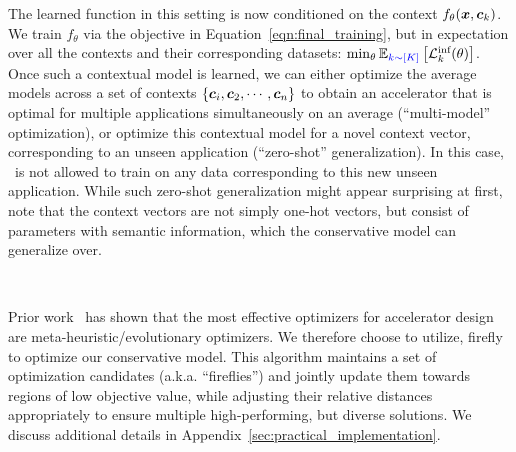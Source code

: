 The learned function in this setting is now conditioned on the context $f_\theta({\boldsymbol{x}}, {\boldsymbol{c}}_k)$. We train $f_\theta$ via the objective in Equation~\ref{eqn:final_training}, but in expectation over all the contexts and their corresponding datasets: $\min_\theta \mathbb{E}_{\textcolor{blue}{k \sim [K]}}\left[\mathcal{L}^\text{inf}_k(\theta)\right]$. Once such a contextual model is learned, we can either optimize the average models across a set of contexts $\{{\boldsymbol{c}}_i, {\boldsymbol{c}}_2, \cdots, {\boldsymbol{c}}_n\}$ to obtain an accelerator that is optimal for multiple applications simultaneously on an average (``multi-model'' optimization), or optimize this contextual model for a novel context vector, corresponding to an unseen application (``zero-shot'' generalization). In this case, \primemethodname\ is not allowed to train on any data corresponding to this new unseen application.  While such zero-shot generalization might appear surprising at first, note that the context vectors are not simply one-hot vectors, but consist of parameters with semantic information, which the conservative model can generalize over.

~

 Prior work~\citep{yazdanbakhsh2021apollo} has shown that the most effective optimizers for accelerator design are meta-heuristic/evolutionary optimizers. We therefore choose to utilize, firefly~\citep{yang2010nature,yang2010eagle,liu2013adaptive} to optimize our conservative model. This algorithm maintains a set of optimization candidates (a.k.a. ``fireflies'') and jointly update them towards regions of low objective value, while adjusting their relative distances appropriately to ensure multiple high-performing, but diverse solutions. We discuss additional details in Appendix~\ref{sec:practical_implementation}.

~


